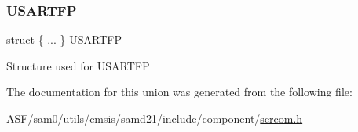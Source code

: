 \subsubsection{\texorpdfstring{USARTFP}{USARTFP}}
{\footnotesize\ttfamily struct \{ ... \}   U\+S\+A\+R\+T\+FP}

Structure used for U\+S\+A\+R\+T\+FP 

The documentation for this union was generated from the following file\+:\begin{DoxyCompactItemize}
\item 
A\+S\+F/sam0/utils/cmsis/samd21/include/component/\mbox{\hyperlink{utils_2cmsis_2samd21_2include_2component_2sercom_8h}{sercom.\+h}}\end{DoxyCompactItemize}
